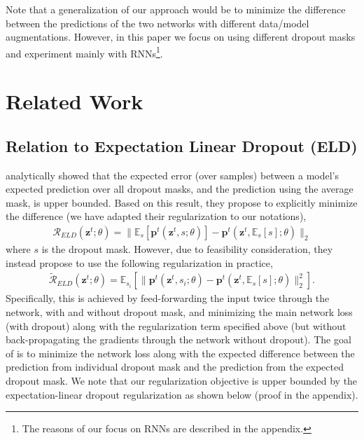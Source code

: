 \documentclass{article} \usepackage{iclr2018_conference,times}
\begin{document}
Note that a generalization of our approach would be to minimize the difference between the predictions of the two networks with different data/model augmentations. However, in this paper we focus on using different dropout masks and experiment mainly with RNNs\footnote{The reasons of our focus on RNNs are described in the appendix.}.

\section{Related Work}

\subsection{Relation to Expectation Linear Dropout (ELD)}

\citet{ma2016dropout} analytically showed that the expected error (over samples) between a model's expected prediction over all dropout masks, and the prediction using the average mask, is upper bounded. Based on this result, they propose to explicitly minimize the difference (we have adapted their regularization to our notations),
\begin{align}
\mathcal{R}_{ELD}(\mathbf{z}^{t}; \theta) = \lVert \mathbb{E}_{s} \left[ \mathbf{p}^t(\mathbf{z}^{t}, s; \theta) \right] - \mathbf{p}^t(\mathbf{z}^{t}, \mathbb{E}_{s}[{s}]; \theta) \rVert_2 
\end{align}
where $s$ is the dropout mask. However, due to feasibility consideration, they instead propose to use the following regularization in practice,
\begin{align}
\mathcal{\tilde{R}}_{ELD}(\mathbf{z}^{t}; \theta) = \mathbb{E}_{s_i} \left[ \lVert   \mathbf{p}^t(\mathbf{z}^{t}, s_i; \theta) - \mathbf{p}^t(\mathbf{z}^{t}, \mathbb{E}_{s}[{s}]; \theta) \rVert_2^2   \right].
\end{align}
Specifically, this is achieved by feed-forwarding the input twice through the network, with and without dropout mask, and minimizing the main network loss (with dropout) along with the regularization term specified above (but without back-propagating the gradients through the network without dropout). The goal of \citet{ma2016dropout} is to minimize the network loss along with the expected difference between the prediction from individual dropout mask and the prediction from the expected dropout mask. We note that our regularization objective is upper bounded by the expectation-linear dropout regularization as shown below (proof in the appendix).
\end{document}
